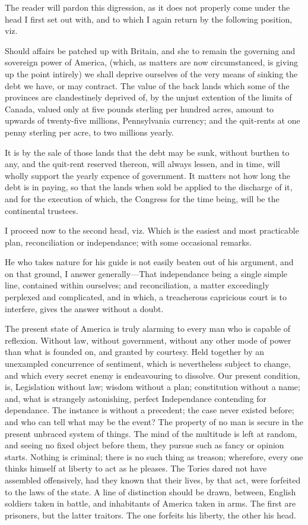 \documentclass[12pt,oneside]{memoir}
\begin{document}
The reader will pardon this digression, as it does not properly come under the head I first set out with, and to which I again return by the following position, viz.

Should affairs be patched up with Britain, and she to remain the governing and sovereign power of America, (which, as matters are now circumstanced, is giving up the point intirely) we shall deprive ourselves of the very means of sinking the debt we have, or may contract. The value of the back lands which some of the provinces are clandestinely deprived of, by the unjust extention of the limits of Canada, valued only at five pounds sterling per hundred acres, amount to upwards of twenty-five millions, Pennsylvania currency; and the quit-rents at one penny sterling per acre, to two millions yearly.

It is by the sale of those lands that the debt may be sunk, without burthen to any, and the quit-rent reserved thereon, will always lessen, and in time, will wholly support the yearly expence of government. It matters not how long the debt is in paying, so that the lands when sold be applied to the discharge of it, and for the execution of which, the Congress for the time being, will be the continental trustees.

I proceed now to the second head, viz. Which is the easiest and most practicable plan, reconciliation or independance; with some occasional remarks.

He who takes nature for his guide is not easily beaten out of his 
argument, and on that ground, I answer generally---That independance being a single simple line, contained within ourselves; and reconciliation, a matter exceedingly perplexed and complicated, and in which, a treacherous capricious court is to interfere, gives the answer without a doubt.

The present state of America is truly alarming to every man who is capable of reflexion. Without law, without government, without any other mode of power than what is founded on, and granted by courtesy. Held together by an unexampled concurrence of sentiment, which is nevertheless subject to change, and which every secret enemy is endeavouring to dissolve. Our present condition, is, Legislation without law; wisdom without a plan; constitution without a name; and, what is strangely astonishing, perfect Independance contending for dependance. The instance is without a precedent; the case never existed before; and who can tell what may be the event? The property of no man is secure in the present unbraced system of things. The mind of the multitude is left at random, and seeing no fixed object before them, they pursue such as fancy or opinion starts. Nothing is criminal; there is no such thing as treason; wherefore, every one thinks himself at liberty to act as he pleases. The Tories dared not have assembled offensively, had they known that their lives, by that act, were forfeited to the laws of the state. A line of distinction should be drawn, between, English soldiers taken in battle, and inhabitants of America taken in arms. The first are prisoners, but the latter traitors. The one forfeits his liberty, the other his head.
\end{document}
